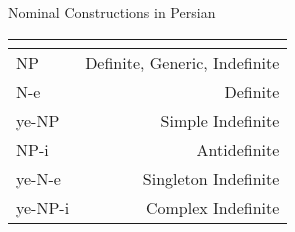 \documentclass[10pt]{beamer}
\begin{document}
\begin {frame} {Nominal Constructions in Persian}

\begin {tabular}{l | r}
\multicolumn{2}{c}{} \\\hline
\hspace{0.44cm}NP & Definite, Generic, Indefinite\\ \hline
\hspace{0.44cm}N-{\color {red}e} & Definite \\ \hline
{\color {ggreen}ye}-NP & Simple Indefinite\\ \hline
\hspace{0.44cm}NP-{\color {blue}i} & Antidefinite\\ \hline
{\color {ggreen}ye}-N-{\color {red}e} & Singleton Indefinite\\ \hline
{\color {ggreen}ye}-NP-{\color {blue}i} & Complex Indefinite\\ \hline
\end {tabular}

\end {frame}
\end{document}
